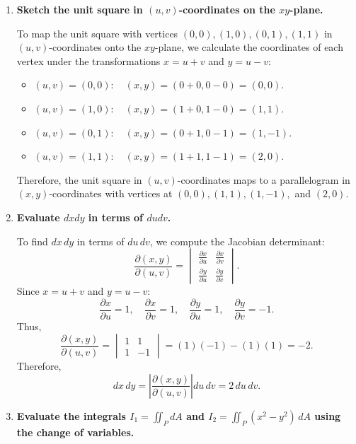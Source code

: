 \documentclass[11pt]{article}
\begin{document}
\begin{enumerate}
    \item \textbf{Sketch the unit square in \( (u, v) \)-coordinates on the \( xy \)-plane.}

    To map the unit square with vertices \( (0, 0), (1, 0), (0, 1), (1, 1) \) in \( (u, v) \)-coordinates onto the \( xy \)-plane, we calculate the coordinates of each vertex under the transformations \( x = u + v \) and \( y = u - v \):
    \begin{itemize}
        \item \( (u, v) = (0, 0): \quad (x, y) = (0 + 0, 0 - 0) = (0, 0) \).
        \item \( (u, v) = (1, 0): \quad (x, y) = (1 + 0, 1 - 0) = (1, 1) \).
        \item \( (u, v) = (0, 1): \quad (x, y) = (0 + 1, 0 - 1) = (1, -1) \).
        \item \( (u, v) = (1, 1): \quad (x, y) = (1 + 1, 1 - 1) = (2, 0) \).
    \end{itemize}
    Therefore, the unit square in \( (u, v) \)-coordinates maps to a parallelogram in \( (x, y) \)-coordinates with vertices at \( (0, 0), (1, 1), (1, -1), \) and \( (2, 0) \).

    \item \textbf{Evaluate \( dxdy \) in terms of \( dudv \).}

    To find \( dx \, dy \) in terms of \( du \, dv \), we compute the Jacobian determinant:
    \[
    \frac{\partial(x, y)}{\partial(u, v)} =
    \begin{vmatrix}
        \frac{\partial x}{\partial u} & \frac{\partial x}{\partial v} \\
        \frac{\partial y}{\partial u} & \frac{\partial y}{\partial v}
    \end{vmatrix}.
    \]
    Since \( x = u + v \) and \( y = u - v \):
    \[
    \frac{\partial x}{\partial u} = 1, \quad \frac{\partial x}{\partial v} = 1, \quad \frac{\partial y}{\partial u} = 1, \quad \frac{\partial y}{\partial v} = -1.
    \]
    Thus,
    \[
    \frac{\partial(x, y)}{\partial(u, v)} = \begin{vmatrix} 1 & 1 \\ 1 & -1 \end{vmatrix} = (1)(-1) - (1)(1) = -2.
    \]
    Therefore,
    \[
    dx \, dy = \left| \frac{\partial(x, y)}{\partial(u, v)} \right| du \, dv = 2 \, du \, dv.
    \]

    \item \textbf{Evaluate the integrals \( I_1 = \iint_{P} dA \) and \( I_2 = \iint_{P} (x^2 - y^2) \, dA \) using the change of variables.}


\end{enumerate}
\end{document}
